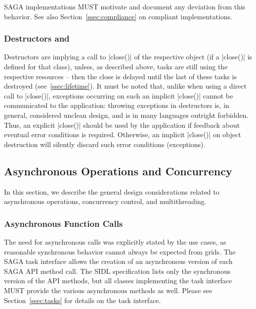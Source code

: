    SAGA implementations MUST motivate and document any deviation
   from this behavior. See also Section~\ref{ssec:compliance}
   on compliant implementations.

   \subsubsection{Destructors and }

    Destructors are implying a call to |close()| of the
    respective object (if a |close()| is defined for that
    class), unless, as described above, tasks are still using
    the respective resources -- then the close is
    delayed until the last of these tasks is destroyed
    (see~\ref{ssec:lifetime}).  It must be noted that, unlike
    when using a direct call to |close()|, exceptions occurring
    on such an implicit |close()| cannot be communicated to the
    application: throwing exceptions in destructors is, in
    general, considered unclean design, and is in many languages
    outright forbidden. Thus, an explicit |close()| should be
    used by the application if feedback about eventual error
    conditions is required.  Otherwise, an implicit
    |close()| on object destruction will silently discard such
    error conditions (exceptions).

    

 \subsection{Asynchronous Operations and Concurrency}
 \label{ssec:async-etc}

  In this section, we describe the general design considerations
  related to asynchronous operations, concurrency control, and
  multithreading.

  \subsubsection{Asynchronous Function Calls}
  
   The need for asynchronous calls was explicitly stated by the
   use cases, as reasonable synchronous behavior cannot always
   be expected from grids. The SAGA task interface
   allows the creation of an asynchronous version of each SAGA
   API method call.  The SIDL specification lists only the
   synchronous version of the API methods, but all
   classes implementing the task interface MUST provide
   the various asynchronous methods as well.  Please see
   Section~\ref{ssec:tasks} for details on the task interface.

